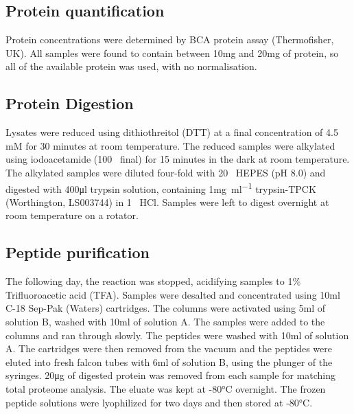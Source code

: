 \subsection{Protein quantification}
Protein concentrations were determined by BCA protein assay (Thermofisher, UK).
All samples were found to contain between 10\si{\mg} and 20\si{\mg} of protein, so all of the available protein was used, with no normalisation.

\subsection{Protein Digestion}
Lysates were reduced using dithiothreitol (DTT) at a final concentration of 4.5 mM for 30 minutes at room temperature.
The reduced samples were alkylated using iodoacetamide (100\si{\milli\Molar} final) for 15 minutes in the dark at room temperature.
The alkylated samples were diluted four-fold with 20\si{\milli\Molar} HEPES (pH 8.0) and digested with 400\si{\ul} trypsin solution, containing 1\si{\mg\per\ml} trypsin-TPCK (Worthington, LS003744) in 1\si{\milli\Molar} HCl.
Samples were left to digest overnight at room temperature on a rotator.

\subsection{Peptide purification}
The following day, the reaction was stopped, acidifying samples to 1\% Trifluoroacetic acid (TFA)\@.
Samples were desalted and concentrated using 10ml C-18 Sep-Pak (Waters) cartridges.
The columns were activated using 5ml of solution B, washed with 10ml of solution A\@.
The samples were added to the columns and ran through slowly.
The peptides were washed with 10ml of solution A\@.
The cartridges were then removed from the vacuum and the peptides were eluted into fresh falcon tubes with 6ml of solution B, using the plunger of the syringes.
20\si{\ug} of digested protein was removed from each sample for matching total proteome analysis.
The eluate was kept at -80\si{\degreeCelsius} overnight.
The frozen peptide solutions were lyophilized for two days and then stored at -80\si{\degreeCelsius}.
%

